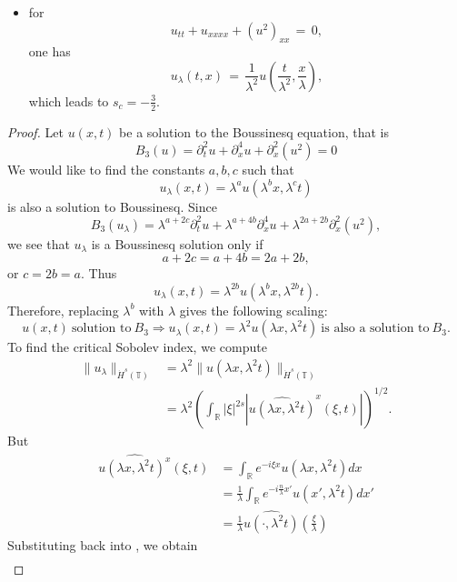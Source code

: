 \documentclass[12pt,reqno]{amsart}
\numberwithin{equation}{section}  %
\renewcommand{\cref}{\Cref}
\newcommand{\rr}{\mathbb{R}}
\newcommand{\ci}{\mathbb{T}}
\newcommand{\wh}{\widehat}
\begin{document}
\begin{itemize}
\item for 
\[
u_{tt}+u_{xxxx}+(u^2)_{xx}\,=\,0,
\]
one has 
\[
u_{\lambda}(t,x)\,=\,\frac{1}{\lambda^2}u\left(\frac{t}{\lambda^2}, \frac{x}{\lambda}\right),
\]
which leads to $s_c=-\frac 32$.
\end{itemize}
\begin{proof}
Let $u(x, t)$ be a solution to the Boussinesq equation, that is
$$
B_3(u)=
\partial_t^2u + \partial^4_x u + \partial_x^2(u^2)  = 0
$$
We would like to find the constants
$a, b, c$ such that
\[
u_\lambda (x, t) = \lambda^a u(\lambda^b x, \lambda^c t)
\]
is also a solution to Boussinesq.  Since 
$$
B_3(u_\lambda)=
\lambda^{a+2c} \partial_t^2u 
+
\lambda^{a+4b} \partial^4_x u 
+
\lambda^{2a+2b}
\partial_x^2(u^2),  
$$
we see that $u_\lambda$ is a Boussinesq solution only if
$$
a+2c=a+4b=2a+2b,
$$
or
$
c= 2b =a.
$
Thus
\[
u_\lambda (x, t) = \lambda^{2b} u(\lambda^{b}x,  \lambda^{2b} t).
\]
Therefore, replacing  $\lambda^b$ with  $ \lambda$ gives the following scaling:
\begin{equation}
\label{DP-scal}
\boxed{u(x, t) \ \text{solution to} \  B_3
\Longrightarrow 
u_\lambda (x, t) = \lambda^2 u(\lambda x, \lambda^2 t)  \ \text{is also a
solution to} \  B_3.}
\end{equation}
\label{rem:scaling}
To find the critical Sobolev index, we compute
\begin{equation}
\begin{split}
\| u_{\lambda} \|_{\dot{H}^s(\ci)} 
& = \lambda^{2} \| u(\lambda x, \lambda^2 t) \|_{\dot{H}^{s}(\ci)}
\\
& = \lambda^{2} \left( \int_{\rr} | \xi |^{2s} | \wh{u (\lambda x,
\lambda^{2} t)}^x (\xi, t)| \right)^{1/2}.
\end{split}
\label{crit-ind-comp}
\end{equation}
But
\begin{equation*}
\begin{split}
\wh{u(\lambda x, \lambda^{2}t)^x}(\xi, t)
& = \int_{\rr}e^{-i\xi x}u(\lambda x, \lambda^2 t) dx
\\
& = \frac{1}{\lambda} \int_{\rr}e^{-i \frac{n}{\lambda} x'}u(x',
\lambda^{2} t) dx'
\\
& = \frac{1}{\lambda} \wh{u(\cdot, \lambda^{2}t)}(\frac{\xi}{\lambda})
\end{split}
\end{equation*}
Substituting back into \cref{crit-ind-comp}, we obtain
\begin{equation*}
\begin{split}

\end{split}
\end{equation*}
\end{proof}
\end{document}

